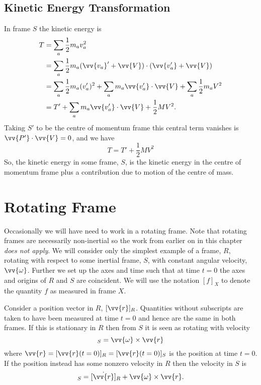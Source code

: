 \documentclass[fleqn]{NotesClass}
\begin{document}
    \subsection{Kinetic Energy Transformation}
    In frame \(S\) the kinetic energy is
    \begin{align}
        T &= \sum_a \frac{1}{2}m_av_a^2\\
        &= \sum_a \frac{1}{2}m_a(\vv{v_a}' + \vv{V})\cdot (\vv{v_a'} + \vv{V})\\
        &= \sum_a\frac{1}{2}m_a(v_a')^2 + \sum_a m_a\vv{v_a'}\cdot\vv{V} + \sum_a \frac{1}{2}m_aV^2\\
        &= T' + \sum_a m_a\vv{v_a'}\cdot\vv{V} + \frac{1}{2}MV^2.
    \end{align}
    Taking \(S'\) to be the centre of momentum frame this central term vanishes is \(\vv{P'}\cdot\vv{V} = 0\), and we have
    \begin{equation}
        T = T' + \frac{1}{2}MV^2
    \end{equation}
    So, the kinetic energy in some frame, \(S\), is the kinetic energy in the centre of momentum frame plus a contribution due to motion of the centre of mass.
    
    \section{Rotating Frame}
    Occasionally we will have need to work in a rotating frame.
    Note that rotating frames are necessarily non-inertial so the work from earlier on in this chapter \emph{does not apply}.
    We will consider only the simplest example of a frame, \(R\), rotating with respect to some inertial frame, \(S\), with constant angular velocity, \(\vv{\omega}\).
    Further we set up the axes and time such that at time \(t = 0\) the axes and origins of \(R\) and \(S\) are coincident.
    We will use the notation \([f]_X\) to denote the quantity \(f\) as measured in frame \(X\).
    
    Consider a position vector in \(R\), \([\vv{r}]_{R}\).
    Quantities without subscripts are taken to have been measured at time \(t = 0\) and hence are the same in both frames.
    If this is stationary in \(R\) then from \(S\) it is seen as rotating with velocity
    \begin{equation}
        [\vv{v}]_S = \vv{\omega} \times \vv{r}
    \end{equation}
    where \(\vv{r} = [\vv{r}(t = 0)]_R = [\vv{r}(t = 0)]_S\) is the position at time \(t = 0\).
    If the position instead has some nonzero velocity in \(R\) then the velocity in \(S\) is
    \begin{equation}
        [\dot{\vv{r}}]_S = [\dot{\vv{r}}]_R + \vv{\omega}\times\vv{r}.
    \end{equation}
    
\end{document}
